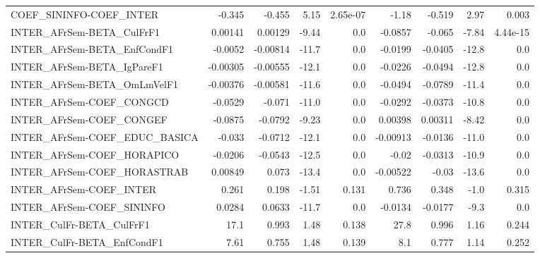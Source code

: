 \begin{tabular}{lrrrrrrrr}
COEF\_SININFO-COEF\_INTER               &      -0.345 &       -0.455 &    5.15 & 2.65e-07 &      -1.18 &      -0.519 &         2.97 &         0.003 \\
INTER\_AFrSem-BETA\_CulFrF1             &     0.00141 &      0.00129 &   -9.44 &      0.0 &    -0.0857 &      -0.065 &        -7.84 &      4.44e-15 \\
INTER\_AFrSem-BETA\_EnfCondF1           &     -0.0052 &     -0.00814 &   -11.7 &      0.0 &    -0.0199 &     -0.0405 &        -12.8 &           0.0 \\
INTER\_AFrSem-BETA\_IgPareF1            &    -0.00305 &     -0.00555 &   -12.1 &      0.0 &    -0.0226 &     -0.0494 &        -12.8 &           0.0 \\
INTER\_AFrSem-BETA\_OmLmVelF1           &    -0.00376 &     -0.00581 &   -11.6 &      0.0 &    -0.0494 &     -0.0789 &        -11.4 &           0.0 \\
INTER\_AFrSem-COEF\_CONGCD              &     -0.0529 &       -0.071 &   -11.0 &      0.0 &    -0.0292 &     -0.0373 &        -10.8 &           0.0 \\
INTER\_AFrSem-COEF\_CONGEF              &     -0.0875 &      -0.0792 &   -9.23 &      0.0 &    0.00398 &     0.00311 &        -8.42 &           0.0 \\
INTER\_AFrSem-COEF\_EDUC\_BASICA         &      -0.033 &      -0.0712 &   -12.1 &      0.0 &   -0.00913 &     -0.0136 &        -11.0 &           0.0 \\
INTER\_AFrSem-COEF\_HORAPICO            &     -0.0206 &      -0.0543 &   -12.5 &      0.0 &      -0.02 &     -0.0313 &        -10.9 &           0.0 \\
INTER\_AFrSem-COEF\_HORASTRAB           &     0.00849 &        0.073 &   -13.4 &      0.0 &   -0.00522 &       -0.03 &        -13.6 &           0.0 \\
INTER\_AFrSem-COEF\_INTER               &       0.261 &        0.198 &   -1.51 &    0.131 &      0.736 &       0.348 &         -1.0 &         0.315 \\
INTER\_AFrSem-COEF\_SININFO             &      0.0284 &       0.0633 &   -11.7 &      0.0 &    -0.0134 &     -0.0177 &         -9.3 &           0.0 \\
INTER\_CulFr-BETA\_CulFrF1              &        17.1 &        0.993 &    1.48 &    0.138 &       27.8 &       0.996 &         1.16 &         0.244 \\
INTER\_CulFr-BETA\_EnfCondF1            &        7.61 &        0.755 &    1.48 &    0.139 &        8.1 &       0.777 &         1.14 &         0.252 \\

\end{tabular}
